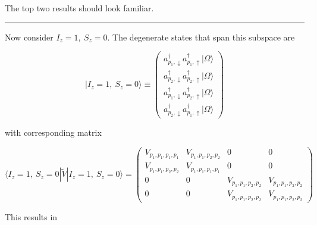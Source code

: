 \documentclass[
  letterpaper,
  DIV=11,
  numbers=noendperiod]{scrartcl}
\begin{document}
The top two results should look familiar.

\begin{center}\rule{0.5\linewidth}{0.5pt}\end{center}

Now consider \(I_z=1,\  S_z=0\). The degenerate states that span this
subspace are

\begin{equation}
|I_z=1,\ S_z=0\rangle\equiv
\begin{pmatrix}
a^\dagger_{p_1,\downarrow}a^\dagger_{p_1,\uparrow}|\Omega\rangle\\
a^\dagger_{p_2,\downarrow}a^\dagger_{p_2,\uparrow}|\Omega\rangle\\
a^\dagger_{p_1,\downarrow}a^\dagger_{p_2,\uparrow}|\Omega\rangle\\
a^\dagger_{p_2,\downarrow}a^\dagger_{p_1,\uparrow}|\Omega\rangle
\end{pmatrix}
\end{equation}

with corresponding matrix

\begin{equation}
\langle I_z=1,\ S_z=0|\tilde V|I_z=1,\ S_z=0\rangle=
\begin{pmatrix}
V_{p_1,p_1,p_1,p_1} & V_{p_1,p_1,p_2,p_2} & 0 & 0\\
V_{p_1,p_1,p_2,p_2} & V_{p_1,p_1,p_1,p_1} & 0 & 0\\
0 & 0 & V_{p_1,p_1,p_2,p_2} & V_{p_1,p_1,p_2,p_2}\\
0 & 0 & V_{p_1,p_1,p_2,p_2} & V_{p_1,p_1,p_2,p_2}
\end{pmatrix}
\end{equation}

This results in
\end{document}
